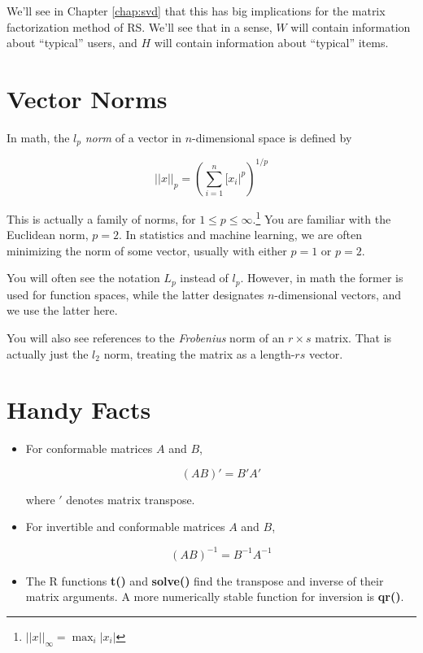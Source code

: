 We'll see in Chapter \ref{chap:svd} that this has big implications for
the matrix factorization method of RS.  We'll see that in a sense, $W$
will contain information about ``typical'' users, and $H$ will contain
information about ``typical'' items.

\section{Vector Norms}
\label{vecnorms}

In math, the $l_p$ \textit{norm} of a vector in $n$-dimensional space is
defined by

\begin{equation}
||x||_p = \left ( \sum_{i=1}^n [x_i|^p \right )^{1/p}
\end{equation}

This is actually a family of norms, for $1 \leq p \leq
\infty$.\footnote{$||x||_{\infty} = \max_i |x_i|$} You are familiar with
the Euclidean norm, $p = 2$.  In statistics and machine learning, we are
often minimizing the norm of some vector, usually with either $p = 1$ or
$p = 2$.

You will often see the notation $L_p$ instead of $l_p$.  However, in
math the former is used for function spaces, while the latter designates
$n$-dimensional vectors, and we use the latter here.

You will also see references to the {\it Frobenius} norm of an $r \times
s$ matrix.  That is actually just the $l_2$ norm, treating the matrix
as a length-$rs$ vector.

\section{Handy Facts}

\begin{itemize}

\item For conformable matrices $A$ and $B$, 

\begin{equation}
(AB)' = B'A'
\end{equation}

where $'$ denotes matrix transpose.

\item For invertible and conformable matrices $A$ and $B$, 

\begin{equation}
(AB)^{-1} = B^{-1} A^{-1}
\end{equation}

\item The R functions \textbf{t()} and \textbf{solve()} find the
transpose and inverse of their matrix arguments.  A more numerically
stable function for inversion is \textbf{qr()}. 

\end{itemize}  
